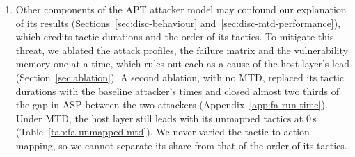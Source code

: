 \documentclass{cshonours}
\begin{document}
\begin{enumerate}[label=T\arabic*, ref=T\arabic*, series=threats, align=left]
\item\label{thr:cause} Other components of the APT attacker model may
confound our explanation of its results (Sections~\ref{sec:disc-behaviour}
and~\ref{sec:disc-mtd-performance}), which credits tactic durations and the
order of its tactics. To mitigate this threat, we ablated the attack profiles,
the failure matrix and the vulnerability memory one at a time, which rules out
each as a cause of the host layer's lead (Section~\ref{sec:ablation}). A
second ablation, with no MTD, replaced its tactic durations with the baseline
attacker's times and closed almost two thirds of the gap in ASP between the two
attackers (Appendix~\ref{app:fa-run-time}). Under MTD, the host layer still
leads with its unmapped tactics at 0\,s (Table~\ref{tab:fa-unmapped-mtd}). We
never varied the tactic-to-action mapping, so we cannot separate its share from
that of the order of its tactics.


\end{enumerate}
\end{document}
